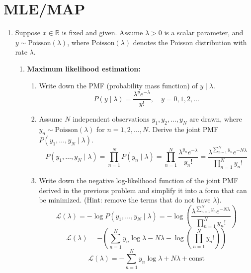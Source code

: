 \documentclass[a3paper,12pt]{extarticle} %
\begin{document}
\section{MLE/MAP}
\begin{enumerate}
    \item Suppose \( x \in \mathbb{R} \) is fixed and given. Assume \( \lambda > 0 \) is a scalar parameter, and \( y \sim \text{Poisson}(\lambda) \), where \(\text{Poisson}(\lambda)\) denotes the Poisson distribution with rate \(\lambda\).

    \begin{enumerate}
        \item \textbf{Maximum likelihood estimation:}
        \begin{enumerate}
            \item Write down the PMF (probability mass function) of \( y \mid \lambda \).
            \[
            P(y \mid \lambda) = \frac{\lambda^y e^{-\lambda}}{y!}, \quad y = 0, 1, 2, \ldots
            \]

            \item Assume \( N \) independent observations \( y_1, y_2, \ldots, y_N \) are drawn, where \( y_n \sim \text{Poisson}(\lambda) \) for \( n = 1, 2, \ldots, N \). Derive the joint PMF \( P(y_1, \ldots, y_N \mid \lambda) \).
            \[
            P(y_1, \ldots, y_N \mid \lambda) = \prod_{n=1}^N P(y_n \mid \lambda) = \prod_{n=1}^N \frac{\lambda^{y_n} e^{-\lambda}}{y_n!} = \frac{\lambda^{\sum_{n=1}^N y_n} e^{-N\lambda}}{\prod_{n=1}^N y_n!}
            \]

            \item Write down the negative log-likelihood function of the joint PMF derived in the previous problem and simplify it into a form that can be minimized. (Hint: remove the terms that do not have \(\lambda\)).
            \[
            \mathcal{L}(\lambda) = -\log P(y_1, \ldots, y_N \mid \lambda) = -\log \left( \frac{\lambda^{\sum_{n=1}^N y_n} e^{-N\lambda}}{\prod_{n=1}^N y_n!} \right)
            \]
            \[
            \mathcal{L}(\lambda) = -\left( \sum_{n=1}^N y_n \log \lambda - N\lambda - \log \left( \prod_{n=1}^N y_n! \right) \right)
            \]
            \[
            \mathcal{L}(\lambda) = -\sum_{n=1}^N y_n \log \lambda + N\lambda + \text{const}
            \]
        \end{enumerate}


\end{enumerate}
\end{enumerate}
\end{document}
